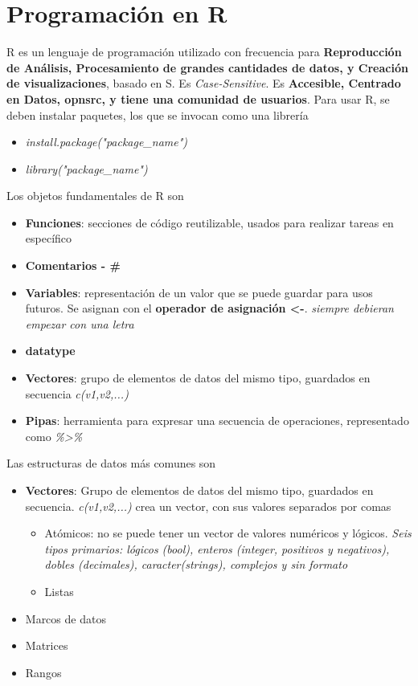 
\section{Programación en R}
R es un lenguaje de programación utilizado con frecuencia para \textbf{Reproducción de Análisis, Procesamiento de grandes cantidades de datos, y Creación de visualizaciones}, basado en S. Es \textit{Case-Sensitive}. Es \textbf{Accesible, Centrado en Datos, \gls{opnsrc}, y tiene una comunidad de usuarios}. Para usar R, se deben instalar paquetes, los que se invocan como una librería
\begin{itemize}
    \item {\textit{install.package("package\_name")}}
    \item {\textit{library("package\_name")}}
\end{itemize}
Los objetos fundamentales de R son 
\begin{itemize}
    \item {\textbf{Funciones}: secciones de código reutilizable, usados para realizar tareas en específico}
    \item {\textbf{Comentarios - \#}}
    \item {\textbf{Variables}: representación de un valor que se puede guardar para usos futuros. Se asignan con el \textbf{operador de asignación <-}. \textit{siempre debieran empezar con una letra}}
    \item {\textbf{\gls{datatype}}}
    \item {\textbf{Vectores}: grupo de elementos de datos del mismo tipo, guardados en secuencia \textit{c(v1,v2,...)}}
    \item {\textbf{Pipas}: herramienta para expresar una secuencia de operaciones, representado como \textit{\%>\%}}
\end{itemize}
Las estructuras de datos más comunes son
\begin{itemize}
    \item {\textbf{Vectores}: Grupo de elementos de datos del mismo tipo, guardados en secuencia. \textit{c(v1,v2,...)} crea un vector, con sus valores separados por comas
    \begin{itemize}
        \item {Atómicos: no se puede tener un vector de valores numéricos y lógicos. \textit{Seis tipos primarios: lógicos (bool), enteros (integer, positivos y negativos), dobles (decimales), caracter(strings), complejos y sin formato}}
        \item {Listas}
    \end{itemize}}
    \item {Marcos de datos}
    \item {Matrices}
    \item {Rangos}
\end{itemize}
